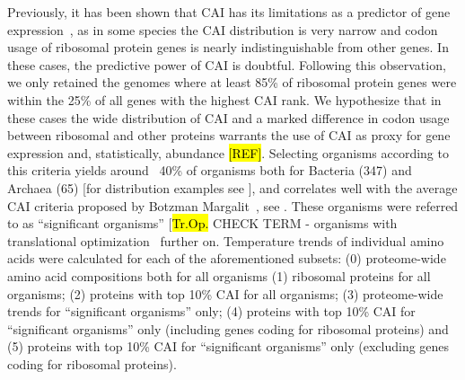 \documentclass[10pt,letterpaper]{article}
\begin{document}

Previously, it has been shown that CAI has its limitations as a predictor of gene expression~\cite{Botzman2011Variation}, as in some species the CAI distribution is very narrow and codon usage of ribosomal protein genes is nearly indistinguishable from other genes. In these cases, the predictive power of CAI is doubtful. Following this observation, we only retained the genomes where at least 85\% of ribosomal protein genes were within the 25\% of all genes with the highest CAI rank. We hypothesize that in these cases the wide distribution of CAI and a marked difference in codon usage between ribosomal and other proteins warrants the use of CAI as proxy for gene expression and, statistically, abundance \hl{[REF]}. Selecting organisms according to this criteria yields around ~40\% of organisms both for Bacteria (347) and Archaea (65) [for distribution examples see ], and correlates well with the average CAI criteria proposed by Botzman Margalit~\cite{Botzman2011Variation}, see . These organisms were referred to as ``significant organisms'' [\hl{Tr.Op.} CHECK TERM - organisms with translational optimization~\cite{Botzman2011Variation} further on. Temperature trends of individual amino acids were calculated for each of the aforementioned subsets: (0) proteome-wide amino acid compositions both for all organisms (1) ribosomal proteins for all organisms; (2) proteins with top 10\% CAI for all organisms; (3) proteome-wide trends for ``significant organisms'' only; (4) proteins with top 10\% CAI for ``significant organisms'' only (including genes coding for ribosomal proteins) and (5) proteins with top 10\% CAI for ``significant organisms'' only (excluding genes coding for ribosomal proteins).


\end{document}
